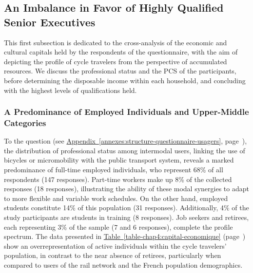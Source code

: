 \begin{refsegment}
\subsection{An Imbalance in Favor of Highly Qualified Senior Executives
    \label{chap4:capital-economique-culturel}
    }

This first subsection is dedicated to the cross-analysis of the economic and cultural capitals held by the respondents of the questionnaire, with the aim of depicting the profile of cycle travelers from the perspective of accumulated resources. We discuss the professional status and the \acrfull{PCS} of the participants, before determining the disposable income within each household, and concluding with the highest levels of qualifications held.%

\subsubsection*{A Predominance of Employed Individuals and Upper-Middle Categories
    \label{chap4:capital-economique-statut-pcs}
    }

To the question  (see \hyperref[annexes:structure-questionnaire-usagers]{Appendix~\ref{annexes:structure-questionnaire-usagers}}, page~\pageref{annexes:structure-questionnaire-usagers}), the distribution of professional status among intermodal users, linking the use of bicycles or micromobility with the public transport system, reveals a marked predominance of full-time employed individuals, who represent 68\% of all respondents (147 responses). Part-time workers make up 8\% of the collected responses (18 responses), illustrating the ability of these modal synergies to adapt to more flexible and variable work schedules. On the other hand, employed students constitute 14\% of this population (31 responses). Additionally, 4\% of the study participants are students in training (8 responses). Job seekers and retirees, each representing 3\% of the sample (7 and 6 responses), complete the profile spectrum. The data presented in \hyperref[table-chap4:capital-economique]{Table~\ref{table-chap4:capital-economique}} (page~\pageref{table-chap4:capital-economique}) show an overrepresentation of active individuals within the cycle travelers' population, in contrast to the near absence of retirees, particularly when compared to users of the rail network and the French population demographics.%


\end{refsegment}
